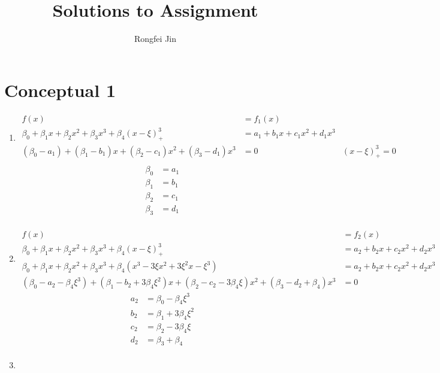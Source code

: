 \documentclass{article}
\title{Solutions to Assignment }
\author{Rongfei Jin}
\begin{document}
\pagestyle{fancy}
\fancyhf{}%
\fancyfoot[C]{\thepage}%
\maketitle

\section*{Conceptual 1}
\begin{enumerate}[label=(\alph*)]
\item
\begin{align*}
f(x) &= f_1(x) \\
\beta_0 + \beta_1 x + \beta_2 x^2 + \beta_3 x^3 + \beta_4(x-\xi)^3_{+} &= a_1 + b_1x + c_1x^2 + d_1x^3 \\
(\beta_0 - a_1) + (\beta_1 - b_1)x + (\beta_2 - c_1)x^2 + (\beta_3 - d_1)x^3 &= 0 & (x-\xi)^3_{+} = 0 \\
\end{align*}
\begin{align*}
    \beta_0 &= a_1 \\
    \beta_1 &= b_1 \\
    \beta_2 &= c_1 \\
    \beta_3 &= d_1 \\
\end{align*}
\item
\begin{align*}
    f(x) &= f_2(x) \\
    \beta_0 + \beta_1 x + \beta_2 x^2 + \beta_3 x^3 + \beta_4(x-\xi)^3_{+} &= a_2 + b_2x + c_2x^2 + d_2x^3 \\
    \beta_0 + \beta_1 x + \beta_2 x^2 + \beta_3 x^3 + \beta_4(x^3 - 3\xi x^2 + 3\xi^2 x - \xi^3) &= a_2 + b_2x + c_2x^2 + d_2x^3 \\
    (\beta_0 - a_2 - \beta_4 \xi^3) + (\beta_1 - b_2 + 3\beta_4 \xi^2)x + (\beta_2 - c_2 - 3\beta_4 \xi)x^2 + (\beta_3 - d_2 + \beta_4)x^3 &= 0 
\end{align*}
\begin{align*}
    a_2 &= \beta_0 - \beta_4 \xi^3 \\
    b_2 &= \beta_1 + 3\beta_4 \xi^2 \\
    c_2 &= \beta_2 - 3\beta_4 \xi \\
    d_2 &= \beta_3 + \beta_4 \\
\end{align*}
\item 

\end{enumerate}
\end{document}
